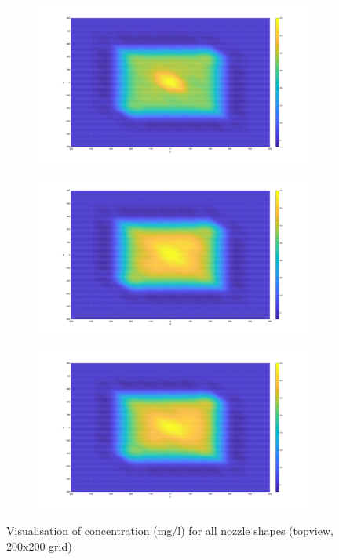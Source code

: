 \begin{figure}[ht!]
\centering
\begin{subfigure}{.33\textwidth}
  \centering
  \includegraphics[width=.9\linewidth]{Images/Round_top.jpg}
\end{subfigure}
\begin{subfigure}{.33\textwidth}
  \centering
  \includegraphics[width=.9\linewidth]{Images/Rec20_top.jpg}
\end{subfigure}
\begin{subfigure}{.33\textwidth}
  \centering
  \includegraphics[width=.9\linewidth]{Images/Rec30_top.jpg}
\end{subfigure}
\caption{Visualisation of concentration (mg/l) for all nozzle shapes (topview, 200x200 grid)}
\label{fig:top_concentratie}
\end{figure}


